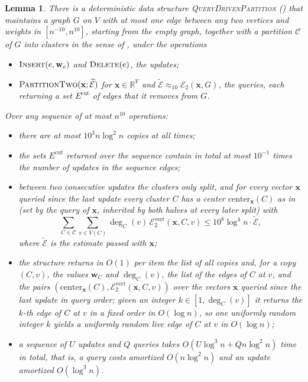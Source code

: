 \documentclass[11pt]{article}
\newtheorem{lemma}[theorem]{Lemma}
\theoremstyle{remark}
\newcommand{\ww}{\mathbf w}
\newcommand{\xx}{\mathbf x}
\newcommand{\Ccal}{\mathcal{C}}
\newcommand{\Ecal}[1]{\mathcal E_{#1}}
\newcommand{\Ecaltil}{\widetilde{\mathcal{E}}}
\newcommand{\Ecalvert}[1]{\mathcal{E}^{\mathrm{vert}}_{#1}}
\newcommand{\Ecut}{E^{\mathrm{cut}}}
\newcommand{\R}{\mathbb R}
\begin{document}
\begin{lemma}
\label{lem:partition}
There is a deterministic data structure \textsc{QueryDrivenPartition}
() that maintains a graph
$G$ on $V$ with at most one edge between any two vertices and weights in
$[n^{-10}, n^{10}]$, starting from the empty graph, together with a
partition $\Ccal$ of $G$ into clusters in the sense of ,
under the operations
\begin{itemize}
\item $\textsc{Insert}(e, \ww_e)$ and $\textsc{Delete}(e)$, the
  \emph{updates};
\item $\textsc{PartitionTwo}(\xx; \Ecaltil)$ for $\xx \in \R^{V}$ and
  $\Ecaltil \approx_{10} \Ecal{2}(\xx, G)$, the \emph{queries}, each
  returning a set $\Ecut$ of edges that it removes from $G$.
\end{itemize}
Over any sequence of at most $n^{10}$ operations:
\begin{itemize}
\item there are at most $10^{3} n \log^{2} n$ copies at all times;
\item the sets $\Ecut$ returned over the sequence contain in total at most
  $10^{-1}$ times the number of updates in the sequence edges;
\item between two consecutive updates the clusters only split, and for
  every vector $\xx$ queried since the last update every cluster $C$ has a
  center $\mathrm{center}_{\xx}(C)$ as in  (set by the
  query of $\xx$, inherited by both halves at every later split) with
  \[
  \sum_{C \in \Ccal} \sum_{v \in V(C)}
  \deg_C(v)\, \Ecalvert{2}(\xx, C, v)
  \le 10^{8} \log^{4} n \cdot \Ecaltil ,
  \]
  where $\Ecaltil$ is the estimate passed with $\xx$;
\item the structure returns in $O(1)$ per item the list of all copies and,
  for a copy $(C, v)$, the values $\ww_C$ and $\deg_C(v)$, the list of the
  edges of $C$ at $v$, and the pairs
  $(\mathrm{center}_{\xx}(C), \Ecalvert{2}(\xx, C, v))$ over the vectors
  $\xx$ queried since the last update in query order; given an integer
  $k \in [1, \deg_C(v)]$ it returns the $k$-th edge of $C$ at $v$ in a fixed
  order in $O(\log n)$, so one uniformly random integer $k$ yields a
  uniformly random live edge of $C$ at $v$ in $O(\log n)$;
\item a sequence of $U$ updates and $Q$ queries takes
  $O(U \log^{3} n + Q n \log^{2} n)$ time in total, that is, a query costs
  amortized $O(n \log^{2} n)$ and an update amortized $O(\log^{3} n)$.
\end{itemize}
\end{lemma}
\end{document}
